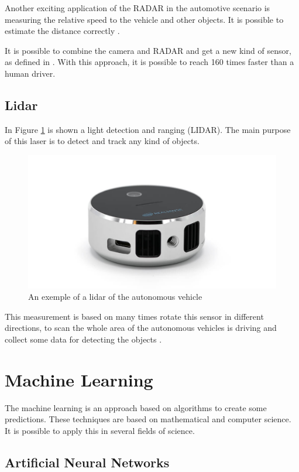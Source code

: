 Another exciting application of the RADAR in the automotive scenario is measuring the relative speed to the vehicle and other objects. It is possible to estimate the distance correctly  \cite{stevenson2011long}.

It is possible to combine the camera and RADAR and get a new kind of sensor, as defined in \cite{kamerad}. With this approach, it is possible to reach 160 times faster than a human driver.

\subsection{Lidar}
In Figure \ref{fig:lidar} is shown a light detection and ranging (LIDAR). The main purpose of this laser is to detect and track any kind of objects. 
\begin{figure}[H]
\centering
\includegraphics[width=\columnwidth]{imagens/lidar.jpg}
\caption{An exemple of a lidar of the autonomous vehicle}
\label{fig:lidar}
\end{figure}

This measurement is based on many times rotate this sensor in different directions, to scan the whole area of the autonomous vehicles is driving and collect some data for detecting the objects \cite{gao2018object}.

\section{Machine Learning}\label{ml-ai}
The machine learning is an approach based on algorithms to create some predictions. These techniques are based on mathematical and computer science. It is possible to apply this in several fields of science. 
\subsection{Artificial Neural Networks}


